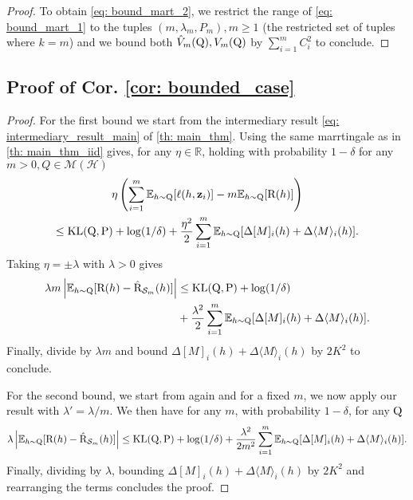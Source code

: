 \begin{noaddcontents}
\begin{proof}
To obtain \cref{eq: bound_mart_2}, we restrict the range of \cref{eq: bound_mart_1} to the tuples $(m,\lambda_m,P_m), m\geq 1$ (the restricted set of tuples where $k=m$) and we bound both $\hat{V}_m(\mathrm{Q}),V_m(\mathrm{Q})$ by $\sum_{i=1}^m C_i^2$ to conclude.
\end{proof}

\subsection{Proof of Cor. \ref{cor: bounded_case}}


\begin{proof}
For the first bound we start from the intermediary result \cref{eq: intermediary_result_main} of  \cref{th: main_thm}. Using the same marrtingale as in \cref{th: main_thm_iid} gives, for any $\eta\in\mathbb{R}$, holding with probability $1-\delta$ for any $m>0,Q\in\mathcal{M}(\mathcal{H})$
\begin{multline*}
\eta \left(\sum_{i=1}^m \mathbb{E}_{h\sim \mathrm{Q}}[\ell(h,\mathbf{z}_i)]  -m \mathbb{E}_{h\sim \mathrm{Q}}[ \text{R}(h) ] \right) \\
\leq  \operatorname{KL}(\mathrm{Q},\mathrm{P}) +\log(1/\delta) + \frac{\eta^2}{2}\sum_{i=1}^m \mathbb{E}_{h\sim \mathrm{Q}}[\Delta[M]_i(h) + \Delta \langle M\rangle_i(h) ].
\end{multline*}
Taking $\eta= \pm\lambda$ with $\lambda>0$ gives
\begin{align}
\label{eq: temp_result}
\lambda m\left | \mathbb{E}_{h\sim \mathrm{Q}}[ \text{R}(h) -\hat{\text{R}}_{\mathcal{S}_m}(h)] \right | & \leq \operatorname{KL}(\mathrm{Q},\mathrm{P}) +\log(1/\delta) \\
& + \frac{\lambda^2}{2}\sum_{i=1}^m \mathbb{E}_{h\sim \mathrm{Q}}[\Delta[M]_i(h) + \Delta \langle M\rangle_i(h) ].
\end{align}
Finally, divide by $\lambda m$ and bound $\Delta[M]_i(h) + \Delta \langle M\rangle_i(h)$ by $2K^2$ to conclude.


For the second bound, we start from  again and for a fixed $m$, we now apply our result with $\lambda'=\lambda/m$. We then have for any $m$, with probability $1-\delta$, for any $\mathrm{Q}$
\[ \lambda\left |  \mathbb{E}_{h\sim \mathrm{Q}}[ \text{R}(h) -\hat{\text{R}}_{\mathcal{S}_m}(h)] \right |  \leq \operatorname{KL}(\mathrm{Q},\mathrm{P}) +\log(1/\delta) + \frac{\lambda^2}{2m^2}\sum_{i=1}^m \mathbb{E}_{h\sim \mathrm{Q}}[\Delta[M]_i(h) + \Delta \langle M\rangle_i(h) ].\]
Finally, dividing by $\lambda$, bounding $\Delta[M]_i(h) + \Delta \langle M\rangle_i(h)$ by $2K^2$ and rearranging the terms concludes the proof.
\end{proof}


\end{noaddcontents}
